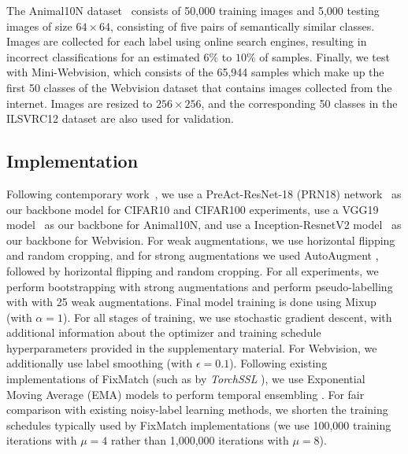 \documentclass[10pt,twocolumn,letterpaper]{article}
\begin{document}
The Animal10N dataset~\cite{song2019selfie} consists of 50,000 training images and 5,000 testing images of size $64 \times 64$, consisting of five pairs of semantically similar classes. Images are collected for each label using online search engines, resulting in incorrect classifications for an estimated $6\%$ to $10\%$ of samples.
Finally, we test with Mini-Webvision, which consists of the 65,944 samples which make up the first 50 classes of the Webvision dataset that contains images collected from the internet. Images are resized to $256 \times 256$, and the corresponding 50 classes in the ILSVRC12 dataset \cite{deng2009imagenet} are also used for validation.

\subsection{Implementation}


Following contemporary work~\citep{li2020dividemix, cordeiro2021propmix, liu2020early}, we use a PreAct-ResNet-18 (PRN18) network~\citep{he2016identity} as our backbone model for CIFAR10 and CIFAR100 experiments, use a VGG19 model~\cite{simonyan2014very} as our backbone for Animal10N, and use a Inception-ResnetV2 model~\cite{szegedy2017inception} as our backbone for Webvision. For weak augmentations, we use horizontal flipping and random cropping, and for strong augmentations we used AutoAugment \cite{cubuk2019autoaugment}, followed by horizontal flipping and random cropping. For all experiments, we perform bootstrapping with strong augmentations 
and perform pseudo-labelling with with 25 weak augmentations. Final model training is done using Mixup \cite{zhang2018mixup} (with $\alpha=1$). For all stages of training, we use stochastic gradient descent, with additional information about the optimizer and training schedule hyperparameters provided in the supplementary material. For Webvision, we additionally use label smoothing (with $\epsilon=0.1$).
Following existing implementations of FixMatch (such as by \textit{TorchSSL} \cite{zhang2021flexmatch}), we use Exponential Moving Average (EMA) models to perform temporal ensembling \cite{Laine2017TemporalEF}. For fair comparison with existing noisy-label learning methods, we shorten the training schedules typically used by FixMatch implementations (we use 100,000 training iterations with $\mu=4$ rather than 1,000,000 iterations with $\mu=8$). 
\end{document}
